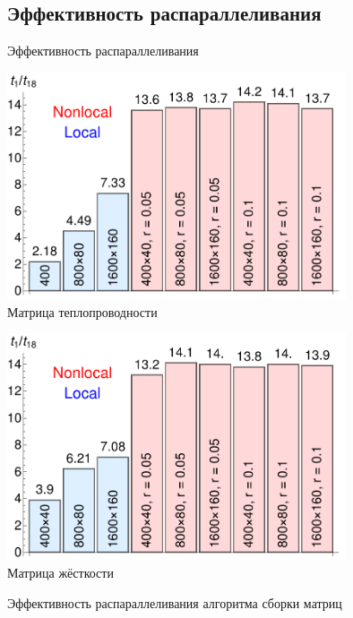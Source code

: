 \subsection{Эффективность распараллеливания}
\begin{frame}{Эффективность распараллеливания}
	\begin{minipage}{0.49\textwidth}
		\centering
		\includegraphics[width=0.75\textwidth]{pics/OMPThermalPresentation.pdf} \\
		Матрица теплопроводности
	\end{minipage}
	\begin{minipage}{0.49\textwidth}
		\centering
		\includegraphics[width=0.75\textwidth]{pics/OMPMechanicalPresentation.pdf} \\
		Матрица жёсткости
	\end{minipage}
	\begin{center}
		Эффективность распараллеливания алгоритма сборки матриц
	\end{center}
	

\end{frame}

